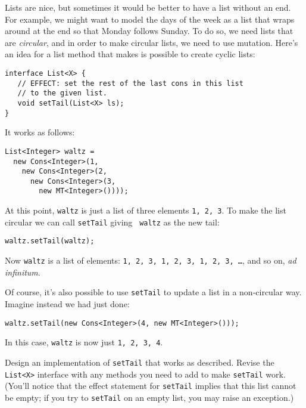 \documentclass[12pt]{article}                   %
\def\pts#1{\marginpar{\footnotesize \raggedright  \fbox{#1 {\sc Points}}}}
\begin{document}
\begin{problem} \pts{??}

Lists are nice, but sometimes it would be better to have a list
without an end.  For example, we might want to model the days of the
week as a list that wraps around at the end so that Monday follows
Sunday.  To do so, we need lists that are \emph{circular}, and in
order to make circular lists, we need to use mutation.  Here's an idea
for a list method that makes is possible to create cyclic lists:

\begin{verbatim}
interface List<X> {
   // EFFECT: set the rest of the last cons in this list
   // to the given list.
   void setTail(List<X> ls);
}
\end{verbatim}

\noindent
It works as follows:

\begin{verbatim}
List<Integer> waltz =
  new Cons<Integer>(1,
    new Cons<Integer>(2,
      new Cons<Integer>(3,
        new MT<Integer>())));

\end{verbatim}
At this point, {\tt waltz} is just a list of three elements {\tt 1, 2,
  3}.  To make the list circular we can call {\tt setTail} giving {\tt
  waltz} as the new tail:

\begin{verbatim}
waltz.setTail(waltz);
\end{verbatim}

\noindent
Now {\tt waltz} is a list of elements: {\tt 1, 2, 3, 1, 2, 3, 1, 2, 3,
  \dots}, and so on, \emph{ad infinitum}.

Of course, it's also possible to use {\tt setTail} to update a list in
a non-circular way.  Imagine instead we had just done:

\begin{verbatim}
waltz.setTail(new Cons<Integer>(4, new MT<Integer>()));
\end{verbatim}

\noindent
In this case, {\tt waltz} is now just {\tt 1, 2, 3, 4}.

\newpage
Design an implementation of {\tt setTail} that works as described.
Revise the {\tt List<X>} interface with any methods you need to add to
make {\tt setTail} work.  (You'll notice that the effect statement for
{\tt setTail} implies that this list cannot be empty; if you try to
{\tt setTail} on an empty list, you may raise an exception.)

\end{problem}
\end{document}
